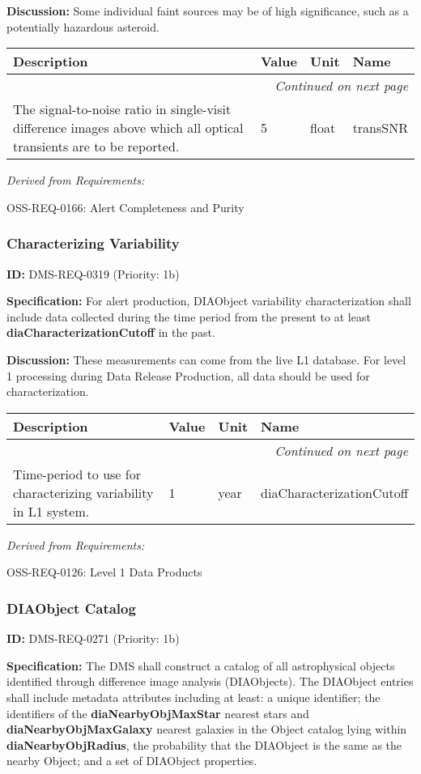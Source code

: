 \documentclass[SE,toc,lsstdraft]{lsstdoc}
\makeatletter
\newcommand{\paramname}[1]{\hspace{0pt}#1}
\newcommand{\unitname}[1]{\hspace{0pt}#1}
\newenvironment{parameters}[0]{%
\setlength\LTleft{0pt}
\setlength\LTright{\fill}
\begin{small}
\begin{longtable}[]{|p{0.49\textwidth}|l|p{0.6in}|p{1.70in}@{}|}

\hline \textbf{Description} & \textbf{Value} & \textbf{Unit} & \textbf{Name} \\ \hline
\endhead

\hline \multicolumn{4}{r}{\emph{Continued on next page}} \\
\endfoot

\hline\hline
\endlastfoot
}{%
\hline
\end{longtable}
\end{small}
}
\makeatother
\begin{document}
\textbf{Discussion: }Some individual faint sources may be of high significance, such as a potentially hazardous asteroid.

\begin{parameters}
The signal-to-noise ratio in single-visit difference images above which all optical transients are to be reported.
&
5
&
\unitname{%
float
}
&
\paramname{%
transSNR
} \\\hline
\end{parameters}

\emph{Derived from Requirements:}

OSS-REQ-0166:
Alert Completeness and Purity \newline

\subsubsection{Characterizing Variability}

\label{DMS-REQ-0319}
\textbf{ID:} DMS-REQ-0319 (Priority: 1b)

\textbf{Specification:} For alert production, DIAObject variability characterization shall include data collected during the time period from the present to at least \textbf{diaCharacterizationCutoff} in the past.

\textbf{Discussion:} These measurements can come from the live L1 database. For level 1 processing during Data Release Production, all data should be used for characterization.

\begin{parameters}
Time-period to use for characterizing variability in L1 system.
&
1
&
\unitname{%
year
}
&
\paramname{%
diaCharacterizationCutoff
} \\\hline
\end{parameters}

\emph{Derived from Requirements:}

OSS-REQ-0126:
Level 1 Data Products \newline

\subsubsection{DIAObject Catalog}

\label{DMS-REQ-0271}
\textbf{ID:} DMS-REQ-0271 (Priority: 1b)

\textbf{Specification:} The DMS shall construct a catalog of all astrophysical objects identified through difference image analysis (DIAObjects). The DIAObject entries shall include metadata attributes including at least: a unique identifier; the identifiers of the\textbf{ diaNearbyObjMaxStar} nearest stars and \textbf{diaNearbyObjMaxGalaxy} nearest galaxies in the Object catalog lying within \textbf{diaNearbyObjRadius}, the probability that the DIAObject is the same as the nearby Object; and a set of DIAObject properties.
\end{document}
